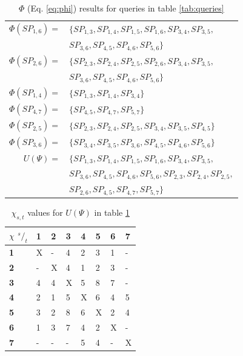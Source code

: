 \begin{table}
\begin{tabular}{r p{}}
$\Phi(SP_{1,6})=$ 	& $\{SP_{1,3},SP_{1,4},SP_{1,5},SP_{1,6},SP_{3,4},SP_{3,5},$\\
		 	& $SP_{3,6},SP_{4,5},SP_{4,6},SP_{5,6}\}$ \\
$\Phi(SP_{2,6})=$ 	& $\{SP_{2,3},SP_{2,4},SP_{2,5},SP_{2,6},SP_{3,4},SP_{3,5},$ \\
			& $SP_{3,6},SP_{4,5},SP_{4,6},SP_{5,6}\}$ \\
$\Phi(SP_{1,4})=$ 	& $\{SP_{1,3},SP_{1,4},SP_{3,4}\}$ \\
$\Phi(SP_{4,7})=$ 	& $\{SP_{4,5},SP_{4,7},SP_{5,7}\}$ \\
$\Phi(SP_{2,5})=$ 	& $\{SP_{2,3},SP_{2,4},SP_{2,5},SP_{3,4},SP_{3,5},SP_{4,5}\}$ \\
$\Phi(SP_{3,6})=$ 	& $\{SP_{3,4},SP_{3,5},SP_{3,6},SP_{4,5},SP_{4,6},SP_{5,6}\}$ \\\hline
$U(\Psi) =$ 		& $\{SP_{1,3},SP_{1,4},SP_{1,5},SP_{1,6},SP_{3,4},SP_{3,5},$ \\
			& $SP_{3,6},SP_{4,5},SP_{4,6},SP_{5,6},SP_{2,3},SP_{2,4},SP_{2,5},$ \\
			& $SP_{2,6},SP_{4,5},SP_{4,7},SP_{5,7}\}$  \\
\end{tabular}
\caption{$\Phi$ (Eq. \ref{eq:phi}) results for queries in table \ref{tab:queries}}
\label{tab:chi}
\end{table}

\begin{table}
\center
\begin{tabular}{|l||l|l|l|l|l|l|l|}
\textbf{$\chi$ ${^s/_t}$}& \textbf{1}	& \textbf{2}	& \textbf{3}	& \textbf{4}	& \textbf{5}	& \textbf{6}	& \textbf{7} \\\hline
\textbf{1}	& X	& -	& 4	& 2	& 3	& 1	& -	 \\
\textbf{2}	& -	& X	& 4	& 1	& 2	& 3	& -	 \\
\textbf{3}	& 4	& 4	& X	& 5	& 8	& 7	& -	 \\
\textbf{4}	& 2	& 1	& 5	& X	& 6	& 4	& 5	 \\
\textbf{5}	& 3	& 2	& 8	& 6	& X	& 2	& 4	 \\
\textbf{6}	& 1	& 3	& 7	& 4	& 2	& X	& -	 \\
\textbf{7}	& -	& -	& -	& 5	& 4	& -	& X	 \\
\end{tabular}
\caption{$\chi_{s,t}$ values for $U(\Psi)$ in table \ref{tab:chi}}
\label{tab:freq}
\end{table}



